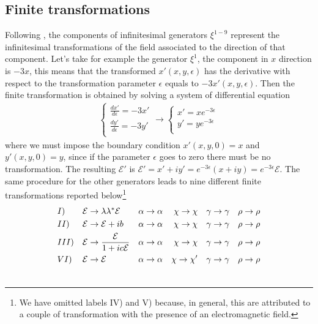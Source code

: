 \subsection{Finite transformations}\label{trasformazioni finite}
Following \citep{corti}, the components of infinitesimal generators $\xi^{1-9}$ represent the infinitesimal transformations of the field associated to the direction of that component. Let's take for example the generator $\xi^1$, the component in $x$ direction is $-3x$, this means that the transformed $x'(x,y,\epsilon)$ has the derivative with respect to the transformation parameter $\epsilon$ equals to $-3x'(x,y,\epsilon)$. Then the finite transformation is obtained by solving a system of differential equation
\begin{equation*}
    \begin{aligned}
        \begin{cases}
           \displaystyle \frac{dx'}{d\epsilon}  = -3x' \\[0.5em] 
           \displaystyle \frac{dy'}{d\epsilon}  = -3y' \\
        \end{cases}
        \rightarrow
        \begin{cases}
            \displaystyle x'=xe^{-3\epsilon} \\[0.5em] 
           \displaystyle y'=ye^{-3\epsilon} \\
        \end{cases}
    \end{aligned}
\end{equation*}
where we must impose the boundary condition $x'(x,y,0)=x$ and $y'(x,y,0)=y$, since if the parameter $\epsilon$ goes to zero there must be no transformation. The resulting $\mathcal{E}'$ is  $\mathcal{E}' = x'+iy'=e^{-3\epsilon}(x+iy)=e^{-3\epsilon}\mathcal{E}$. The same procedure for the other generators leads to nine different finite transformations reported below\footnote{We have omitted labels IV) and V) because, in general, this are attributed to a couple of transformation with the presence of an electromagnetic field.}
\begin{align}
  &I) & \mathcal{E} &\rightarrow \lambda\lambda^*\mathcal{E} & \alpha &\rightarrow \alpha & \chi \rightarrow \chi  &&  \gamma \rightarrow \gamma && \rho \rightarrow \rho \notag\\
  &II) &  \mathcal{E} &\rightarrow \mathcal{E}+ib & \alpha &\rightarrow \alpha & \chi \rightarrow \chi  &&  \gamma \rightarrow \gamma && \rho \rightarrow \rho \notag\\
  &III) &  \mathcal{E} &\rightarrow \frac{\mathcal{E}}{1+ic\mathcal{E}}& \alpha &\rightarrow \alpha & \chi \rightarrow \chi  &&  \gamma \rightarrow \gamma && \rho \rightarrow \rho \notag\\
  &VI) &  \mathcal{E} &\rightarrow \mathcal{E}& \alpha &\rightarrow \alpha & \chi \rightarrow \chi'  &&  \gamma \rightarrow \gamma && \rho \rightarrow \rho \notag\\ \notag
\end{align}
